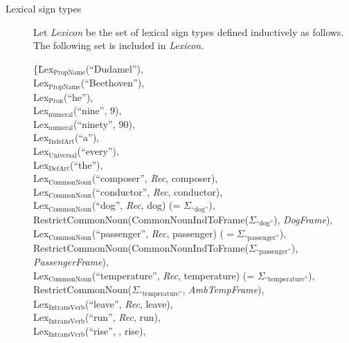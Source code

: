 \begin{description}



\item[Lexical sign types] \mbox{}

  Let \textit{Lexicon} be the set of lexical sign types defined
  inductively as follows.  The
  following set is included in \textit{Lexicon}.

\begin{tabbing}
    \{\=Lex$_{\mathrm{PropName}}$(``Dudamel''), \\
    \> Lex$_{\mathrm{PropName}}$(``Beethoven''), \\
    \> Lex$_{\mathrm{Pron}}$(``he''), \\
    \> Lex$_{\mathrm{numeral}}$(``nine'', 9), \\
    \> Lex$_{\mathrm{numeral}}$(``ninety'', 90), \\ 
    \> Lex$_{\mathrm{IndefArt}}$(``a''), \\
    \> Lex$_{\mathrm{Universal}}$(``every''), \\
\> Lex$_{\mathrm{DefArt}}$(``the''),\\
\> Lex$_{\text{CommonNoun}}$(``composer'', \textit{Rec}, composer),\\
\> Lex$_{\text{CommonNoun}}$(``conductor'', \textit{Rec}, conductor), \\
\> Lex$_{\text{CommonNoun}}$(``dog'', \textit{Rec}, dog) (= $\Sigma_{\text{``dog''}}$), \\
\> RestrictCommonNoun(CommonNounIndToFrame($\Sigma_{\text{``dog''}}$),
\textit{DogFrame}),\\
\> Lex$_{\mathrm{CommonNoun}}$(``passenger'', \textit{Rec}, passenger) ($=\Sigma_{\text{``passenger''}}$), \\
\> RestrictCommonNoun(CommonNounIndToFrame($\Sigma_{\text{``passenger''}}$),
\textit{PassengerFrame}), \\
\> Lex$_{\text{CommonNoun}}$(``temperature'', \textit{Rec},
temperature) (= $\Sigma_{\text{``temperature''}}$), \\
\> RestrictCommonNoun($\Sigma_{\text{``temperature''}}$,
\textit{AmbTempFrame}),\\
\> Lex$_{\mathrm{IntransVerb}}$(``leave'', \textit{Rec}, leave), \\
\> Lex$_{\mathrm{IntransVerb}}$(``run'', \textit{Rec}, run), \\
\> Lex$_{\mathrm{IntransVerb}}$(``rise'', ,
rise), \\

\end{tabbing}
\end{description}
